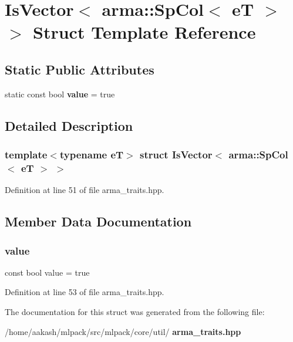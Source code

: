 \section{Is\+Vector$<$ arma\+:\+:Sp\+Col$<$ eT $>$ $>$ Struct Template Reference}
\label{structIsVector_3_01arma_1_1SpCol_3_01eT_01_4_01_4}
\subsection*{Static Public Attributes}
\begin{DoxyCompactItemize}
\item 
static const bool \textbf{ value} = true
\end{DoxyCompactItemize}


\subsection{Detailed Description}
\subsubsection*{template$<$typename eT$>$\newline
struct Is\+Vector$<$ arma\+::\+Sp\+Col$<$ e\+T $>$ $>$}



Definition at line 51 of file arma\+\_\+traits.\+hpp.



\subsection{Member Data Documentation}
\mbox{\label{structIsVector_3_01arma_1_1SpCol_3_01eT_01_4_01_4_a11ddd051208250c32dc4985abcafa86d}} 
\subsubsection{value}
{\footnotesize\ttfamily const bool value = true\hspace{0.3cm}{\ttfamily [static]}}



Definition at line 53 of file arma\+\_\+traits.\+hpp.



The documentation for this struct was generated from the following file\+:\begin{DoxyCompactItemize}
\item 
/home/aakash/mlpack/src/mlpack/core/util/\textbf{ arma\+\_\+traits.\+hpp}\end{DoxyCompactItemize}

